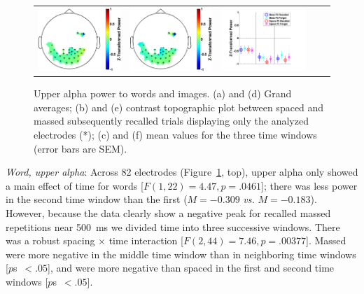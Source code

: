 \begin{figure}[H]
\begin{tabular}{ccccc}
  \includegraphics[width=.19\textwidth]{./figs/exp1/tfr_topocont_ga_img_RgH_rc_spac_p2vsimg_RgH_rc_mass_p2_30ROIs_11_12_0_500_-1p0_1p0_cb} &
  \includegraphics[width=.19\textwidth]{./figs/exp1/tfr_topocont_ga_img_RgH_rc_spac_p2vsimg_RgH_rc_mass_p2_30ROIs_11_12_520_1000_-1p0_1p0_cb} &
  \includegraphics[width=.30\textwidth]{./figs/exp1/tfr_avg_ga_img_RgH_rc_mass_p2_img_RgH_fo_mass_p2_img_RgH_rc_spac_p2_img_RgH_fo_spac_p2_30ROI_0_333_333_666_666_1000_11_12_ylabel} \\
  \end{tabular}
  \caption{Upper alpha power to words and images.  (a) and (d) Grand averages; (b) and (e) contrast topographic plot between spaced and massed subsequently recalled trials displaying only the analyzed electrodes (*); (c) and (f) mean values for the three time windows (error bars are SEM).}
  \label{fig:word_img_alpha_upp}
\end{figure}

\textit{Word, upper alpha}: Across 82 electrodes (Figure~\ref{fig:word_img_alpha_upp}, top), upper alpha only showed a main effect of time for words [$F(1,22)=4.47, p=.0461$]; there was less power in the second time window than the first ($M=-0.309$ \textit{vs.} $M=-0.183$).  However, because the data clearly show a negative peak for recalled massed repetitions near 500~ms we divided time into three successive windows.  There was a robust spacing $\times$ time interaction [$F(2,44)=7.46, p=.00377$].  Massed were more negative in the middle time window than in neighboring time windows [$p$s~$<.05$], and were more negative than spaced in the first and second time windows [$p$s~$<.05$].

